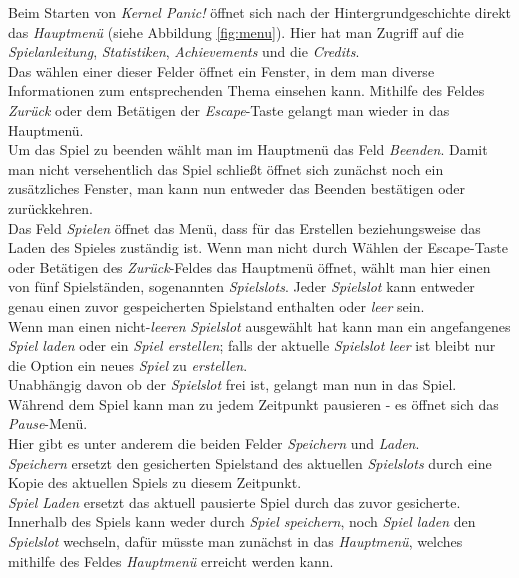 Beim Starten von \textit{Kernel Panic!} öffnet sich nach der Hintergrundgeschichte direkt das \textit{Hauptmenü} (siehe Abbildung \ref{fig:menu}). Hier hat man Zugriff auf die \textit{Spielanleitung}, \textit{Statistiken}, \textit{Achievements} und die \textit{Credits}.\\
Das wählen einer dieser Felder öffnet ein Fenster, in dem man diverse Informationen zum entsprechenden Thema einsehen kann. Mithilfe des Feldes \textit{Zurück} oder dem Betätigen der \textit{Escape}-Taste gelangt man wieder in das Hauptmenü.\\
Um das Spiel zu beenden wählt man im Hauptmenü das Feld \textit{Beenden}. Damit man nicht versehentlich das Spiel schließt öffnet sich zunächst noch ein zusätzliches Fenster, man kann nun entweder das Beenden bestätigen oder zurückkehren.\\
Das Feld \textit{Spielen} öffnet das Menü, dass für das Erstellen beziehungsweise das Laden des Spieles zuständig ist. Wenn man nicht durch Wählen der Escape-Taste oder Betätigen des \textit{Zurück}-Feldes das Hauptmenü öffnet, wählt man hier einen von fünf Spielständen, sogenannten \textit{Spielslots}. Jeder \textit{Spielslot} kann entweder genau einen zuvor gespeicherten Spielstand enthalten oder \textit{leer} sein.\\
Wenn man einen nicht-\textit{leeren} \textit{Spielslot} ausgewählt hat kann man ein angefangenes \textit{Spiel laden} oder ein \textit{Spiel erstellen}; falls der aktuelle \textit{Spielslot} \textit{leer} ist bleibt nur die Option ein neues \textit{Spiel} zu \textit{erstellen}.\\
Unabhängig davon ob der \textit{Spielslot} frei ist, gelangt man nun in das Spiel.\\
Während dem Spiel kann man zu jedem Zeitpunkt pausieren - es öffnet sich das \textit{Pause}-Menü.\\
Hier gibt es unter anderem die beiden Felder \textit{Speichern} und \textit{Laden}.\\
\textit{Speichern} ersetzt den gesicherten Spielstand des aktuellen \textit{Spielslots} durch eine Kopie des aktuellen Spiels zu diesem Zeitpunkt.\\
\textit{Spiel Laden} ersetzt das aktuell pausierte Spiel durch das zuvor gesicherte. Innerhalb des Spiels kann weder durch \textit{Spiel speichern}, noch \textit{Spiel laden} den \textit{Spielslot} wechseln, dafür müsste man zunächst in das \textit{Hauptmenü}, welches mithilfe des Feldes \textit{Hauptmenü} erreicht werden kann.\\
